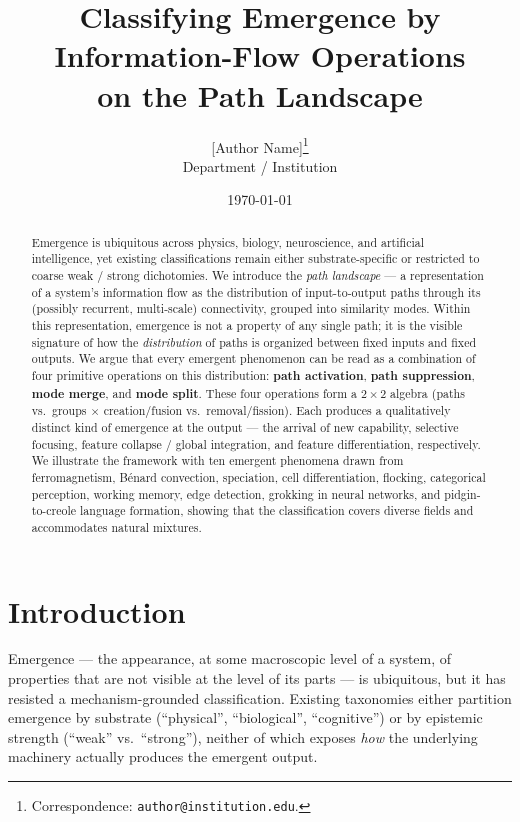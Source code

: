 \documentclass[11pt,a4paper]{article}
\title{\bfseries Classifying Emergence by Information-Flow Operations\\
on the Path Landscape}
\author{[Author Name]\thanks{Correspondence: \texttt{author@institution.edu}.}\\
\small Department / Institution}
\date{\today}
\begin{document}
\maketitle

\begin{abstract}
\noindent
Emergence is ubiquitous across physics, biology, neuroscience, and
artificial intelligence, yet existing classifications remain either
substrate-specific or restricted to coarse weak / strong dichotomies.
We introduce the \emph{path landscape} --- a representation of a
system's information flow as the distribution of input-to-output paths
through its (possibly recurrent, multi-scale) connectivity, grouped
into similarity modes. Within this representation, emergence is not a
property of any single path; it is the visible signature of how the
\emph{distribution} of paths is organized between fixed inputs and
fixed outputs. We argue that every emergent phenomenon can be read as
a combination of four primitive operations on this distribution:
\textbf{path activation}, \textbf{path suppression}, \textbf{mode merge},
and \textbf{mode split}. These four operations form a $2\times 2$
algebra (paths vs.\ groups $\times$ creation/fusion vs.\
removal/fission). Each produces a qualitatively distinct kind of
emergence at the output --- the arrival of new capability, selective
focusing, feature collapse / global integration, and feature
differentiation, respectively. We illustrate the framework with ten
emergent phenomena drawn from ferromagnetism, B\'enard convection,
speciation, cell differentiation, flocking, categorical perception,
working memory, edge detection, grokking in neural networks, and
pidgin-to-creole language formation, showing that the classification
covers diverse fields and accommodates natural mixtures.
\end{abstract}

\section{Introduction}

Emergence --- the appearance, at some macroscopic level of a system,
of properties that are not visible at the level of its parts --- is
ubiquitous, but it has resisted a mechanism-grounded classification.
Existing taxonomies either partition emergence by substrate
(``physical'', ``biological'', ``cognitive'') or by epistemic
strength (``weak'' vs.\ ``strong''), neither of which exposes
\emph{how} the underlying machinery actually produces the emergent
output.
\end{document}
